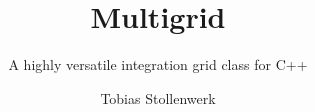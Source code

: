 \documentclass[a4paper]{scrreprt}
\begin{document}
\title{Multigrid}
\subtitle{A highly versatile integration grid class for C++}
\author{Tobias Stollenwerk}
\maketitle

\tableofcontents














\printindex
\end{document}
